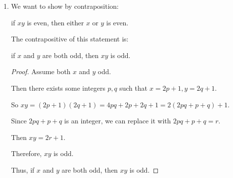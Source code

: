 \documentclass[12pt,letterpaper]{article}
\begin{document}
\begin{enumerate}
\begin{enumerate}
\begin{enumerate}
              if $x^2$ is not divisible by 4, then $x$ is odd.

              The contrapositive of this statement is:

              If $x$ is even, then $x^2$ is divisible by 4.

              \begin{proof}
                Assume $x$ is even.

                Then there exists some integer $p$ such that $x = 2p$.

                So $x^2 = (2p)^2 = 4p^2$.

                Since $p$ is an integer, $p^2$ is also an integer.
                So we can replace it with $p^2 = q$.

                Then $x^2 = 4q$, meaning that 4 divides $x^2$,
                or equivalently $x^2$ is divisible by 4.

                Therefore, $x^2$ is divisible by 4.

                Thus, if $x$ is even, then $x^2$ is divisible by 4.

                Therefore, if $x^2$ is not divisible by 4, then $x$ is odd.
              \end{proof}
            \item

              We want to show by contraposition:

              if $xy$ is even, then either $x$ or $y$ is even.

              The contrapositive of this statement is:

              if $x$ and $y$ are both odd, then $xy$ is odd.

              \begin{proof}
                Assume both $x$ and $y$ odd.

                Then there exists some integers $p, q$ such that $x = 2p + 1, y = 2q + 1$.

                So $xy = (2p + 1)(2q + 1) = 4pq + 2p + 2q + 1 = 2(2pq + p + q) + 1$.

                Since $2pq + p + q$ is an integer, we can replace it with $2pq + p + q = r$.

                Then $xy = 2r + 1$.

                Therefore, $xy$ is odd.

                Thus, if $x$ and $y$ are both odd, then $xy$ is odd.


\end{proof}
\end{enumerate}
\end{enumerate}
\end{enumerate}
\end{document}
